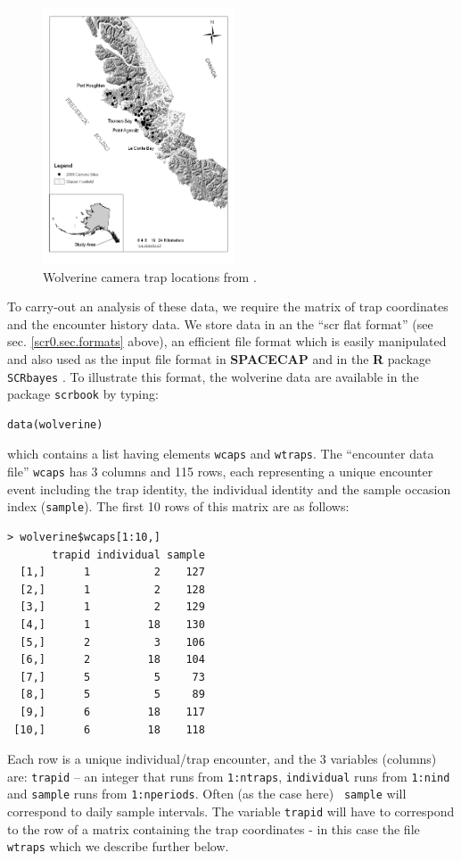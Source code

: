 \begin{figure}
\begin{center}
\includegraphics[height=3in]{Ch4/figs/wolverinelocs}
\end{center}
\caption{Wolverine camera trap locations from \citet{magoun_etal:2011}.}
\label{scr0.fig.wolverinelocs}
\end{figure}

To carry-out an analysis of these data, we require the matrix of trap
coordinates and the encounter history data.  We store data in an the
``scr flat format'' (see sec.  \ref{scr0.sec.formats} above), an
efficient file format which is easily manipulated and also used as the
input file format in {\bf SPACECAP} \citep{gopalaswamy_etal:2012} and
in the {\bf R} package \mbox{\tt SCRbayes} \citep{russell_etal:2012}.
To illustrate this format, the wolverine data are available in the
package \mbox{\tt scrbook} by typing:
\begin{verbatim}
data(wolverine)
\end{verbatim}
which contains a list having elements \mbox{\tt wcaps} and
\mbox{\tt wtraps}.
The ``encounter data file''
\mbox{\tt wcaps}  has 3 columns and 115 rows, each representing a
unique encounter event including the trap identity, the individual
identity and the sample occasion index (\mbox{\tt sample}).
The first 10 rows of this matrix are as
follows:
{\small
\begin{verbatim}
> wolverine$wcaps[1:10,]
       trapid individual sample
  [1,]      1          2    127
  [2,]      1          2    128
  [3,]      1          2    129
  [4,]      1         18    130
  [5,]      2          3    106
  [6,]      2         18    104
  [7,]      5          5     73
  [8,]      5          5     89
  [9,]      6         18    117
 [10,]      6         18    118
\end{verbatim}
}
Each row is a unique 
individual/trap encounter, and the 3 variables (columns) are: 
\mbox{\tt trapid} -- an
integer that runs from \mbox{\tt 1:ntraps}, \mbox{\tt individual} runs from
\mbox{\tt 1:nind} and
\mbox{\tt sample} 
runs from \mbox{\tt 1:nperiods}. Often (as the case here) \mbox{\tt
  sample} 
will
correspond to daily sample intervals. The variable \mbox{\tt trapid} will have to
correspond to the row of a matrix containing the trap coordinates - in
this case the file \mbox{\tt wtraps} which we describe further below.

